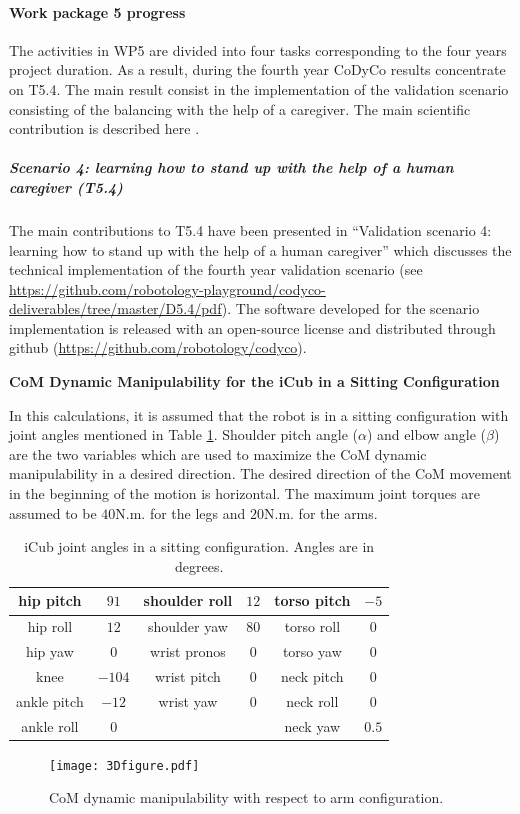 
\paragraph{Work package 5 progress}

The activities in WP5 are divided into four tasks corresponding to the four years project duration. As a result, during the fourth year CoDyCo results concentrate on T5.4. The main result consist in the implementation of the validation scenario consisting of the balancing with the help of a caregiver. The main scientific contribution is described here \cite{latella2016whole}.

\subparagraph{Scenario 4: learning how to stand up with the help of a human caregiver (T5.4)}

The main contributions to T5.4 have been presented in ``Validation scenario 4: learning how to stand up with the help of a human caregiver'' which discusses the technical implementation of the fourth year validation scenario (see \url{https://github.com/robotology-playground/codyco-deliverables/tree/master/D5.4/pdf}). The software developed for the scenario implementation is released with an open-source license and distributed through github (\url{https://github.com/robotology/codyco}).


\textbf{CoM Dynamic Manipulability for the iCub in a Sitting Configuration}


In this calculations, it is assumed that the robot is in a sitting
configuration with joint angles mentioned in Table \ref{jointangles}.
Shoulder pitch angle ($\alpha$) and elbow angle ($\beta$) are the two
variables which are used to maximize the CoM dynamic manipulability in a
desired direction.  The desired direction of the CoM movement in the beginning
of the motion is horizontal.  The maximum joint torques are assumed to be
$40$N.m. for the legs and $20$N.m. for the arms.
%
\begin{table} 
  \centering
  \caption{iCub joint angles in a sitting configuration.  Angles are in
    degrees.}
  \begin{tabular}{|c|c||c|c||c|c|}
    \hline hip pitch   & $91$   & shoulder roll & $12$ & torso pitch & $-5$ \\
    \hline hip roll    & $12$   & shoulder yaw  & $80$ & torso roll  & $0$   \\
    \hline hip yaw     & $0$    & wrist pronos  & $0$  & torso yaw   & $0$   \\
    \hline knee        & $-104$ & wrist pitch   & $0$  & neck pitch  & $0$ \\
    \hline ankle pitch & $-12$  & wrist yaw     & $0$  & neck roll   & $0$ \\
    \hline ankle roll  & $0$    &               &      & neck yaw    & $0.5$ \\
    \hline
  \end{tabular}
  \label{jointangles}
\end{table}
%
\begin{figure}
  \centering
  \texttt{[image: 3Dfigure.pdf]}
  \caption{CoM dynamic manipulability with respect to arm configuration.}
  \label{3Dfig}
\end{figure}
%


